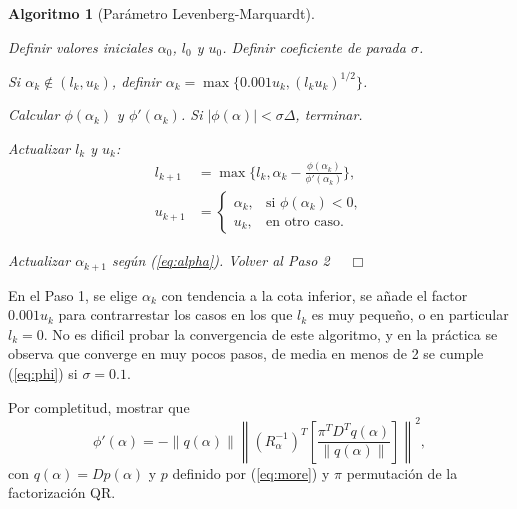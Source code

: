 \documentclass[11pt,a4paper]{book}
\newtheorem{algorithm}[theorem]{Algoritmo}
\theoremstyle{definition}
\theoremstyle{remark}
\newcommand{\norm}[1]{\left\lVert#1\right\rVert}
\begin{document}
\begin{algorithm}[Parámetro Levenberg-Marquardt]\leavevmode
	\begin{steps}
		\item Definir valores iniciales $\alpha_0$, $l_0$ y $u_0$. Definir coeficiente de parada $\sigma$.
		\item Si $\alpha_k \notin (l_k, u_k)$, definir $\alpha_k = \max \{0.001u_k, (l_ku_k)^{1/2}\}$.	
		\item Calcular $\phi(\alpha_k)$ y $\phi'(\alpha_k)$. Si $|\phi(\alpha)|<\sigma\Delta$, terminar.
		\item Actualizar $l_k$ y $u_k$:
			\begin{align*}
				l_{k+1} &= \max \{l_k, \alpha_k-\frac{\phi(\alpha_k)}{\phi'(\alpha_k)}\}, \\
				u_{k+1} &= \begin{cases}
					\alpha_k, & \text{si } \phi(\alpha_k) < 0, \\
					u_k, & \text{en otro caso}.
				\end{cases}
			\end{align*}
		\item Actualizar $\alpha_{k+1}$ según (\ref{eq:alpha}). Volver al Paso 2 $\quad \Box$
	\end{steps}
\end{algorithm}
En el Paso 1, se elige $\alpha_k$ con tendencia a la cota inferior, se añade el factor $0.001u_k$ para
contrarrestar los casos en los que $l_k$ es muy pequeño, o en particular $l_k=0$. No es dificil probar
la convergencia de este algoritmo, y en la práctica se observa que converge en muy pocos pasos,
de media en menos de 2 se cumple (\ref{eq:phi}) si $\sigma=0.1$.

Por completitud, mostrar que
\begin{equation}
	\phi'(\alpha)=-\norm{q(\alpha)} \norm{(R_{\alpha}^{-1})^T\left[
		\frac{\pi^TD^Tq(\alpha)}{\norm{q(\alpha)}}
	 \right] }^2,
\end{equation}
con $q(\alpha)=Dp(\alpha)$ y $p$ definido por (\ref{eq:more}) y $\pi$ permutación de la
factorización QR.
\end{document}
